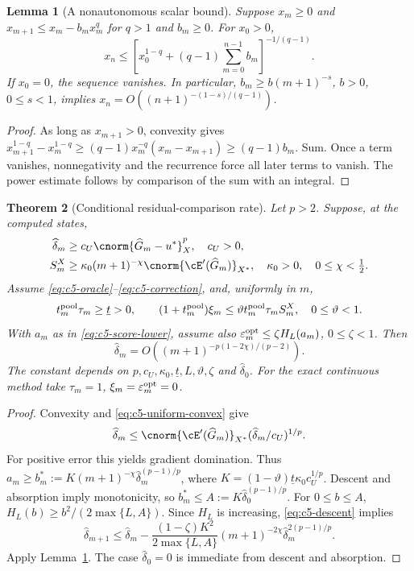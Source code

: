 \documentclass[11pt]{article}
\newtheorem{theorem}{Theorem}[section]
\newtheorem{lemma}[theorem]{Lemma}
\theoremstyle{remark}
\begin{document}
\begin{lemma}[A nonautonomous scalar bound]
\label{lem:c5-recurrence}
Suppose $x_m\geq0$ and
$x_{m+1}\leq x_m-b_mx_m^q$ for $q>1$ and $b_m\geq0$.
For $x_0>0$,
\begin{equation}
 x_n\leq\left[x_0^{1-q}+(q-1)\sum_{m=0}^{n-1}b_m\right]^{-1/(q-1)} .
 \label{eq:c5-recurrence}
\end{equation}
If $x_0=0$, the sequence vanishes. In particular,
$b_m\geq b(m+1)^{-s}$, $b>0$, $0\leq s<1$, implies
$x_n=O((n+1)^{-(1-s)/(q-1)})$.
\end{lemma}
\begin{proof}
As long as $x_{m+1}>0$, convexity gives
$x_{m+1}^{1-q}-x_m^{1-q}\geq
(q-1)x_m^{-q}(x_m-x_{m+1})\geq(q-1)b_m$.
Sum. Once a term vanishes, nonnegativity and the recurrence force all
later terms to vanish. The power estimate follows by comparison of the
sum with an integral.
\end{proof}

\begin{theorem}[Conditional residual-comparison rate]
\label{thm:c5-visible}
Let $p>2$. Suppose, at the computed states,
\begin{align}
 \widehat\delta_m&\geq c_U\cnorm{\widehat G_m-u^*}_X^p,\quad c_U>0,
 \label{eq:c5-uniform-convex}\\
 S_m^X&\geq\kappa_0(m+1)^{-\chi}
                   \cnorm{\cE'(\widehat G_m)}_{X^*},
 \quad\kappa_0>0,\quad0\leq\chi<\tfrac12 .
 \label{eq:c5-visible}
\end{align}
Assume \eqref{eq:c5-oracle}--\eqref{eq:c5-correction}, and, uniformly in $m$,
\[
 t_m^{\rm pool}\tau_m\geq\underline t>0,\qquad
 (1+t_m^{\rm pool})\xi_m
 \leq\vartheta t_m^{\rm pool}\tau_m S_m^X,\quad0\leq\vartheta<1 .
\]
With $a_m$ as in \eqref{eq:c5-score-lower}, assume also
$\varepsilon_m^{\rm opt}\leq\zeta H_L(a_m)$, $0\leq\zeta<1$.
Then
\begin{equation}
 \widehat\delta_m=O((m+1)^{-p(1-2\chi)/(p-2)}) .
 \label{eq:c5-visible-rate}
\end{equation}
The constant depends on $p,c_U,\kappa_0,\underline t,L,\vartheta,\zeta$ and
$\widehat\delta_0$. For the exact continuous method take
$\tau_m=1$, $\xi_m=\varepsilon_m^{\rm opt}=0$.
\end{theorem}
\begin{proof}
Convexity and \eqref{eq:c5-uniform-convex} give
\[
 \widehat\delta_m\leq
 \cnorm{\cE'(\widehat G_m)}_{X^*}
       (\widehat\delta_m/c_U)^{1/p}.
\]
For positive error this yields gradient domination.
Thus $a_m\geq b_m^*:=K(m+1)^{-\chi}
\widehat\delta_m^{(p-1)/p}$, where
$K=(1-\vartheta)\underline t\kappa_0c_U^{1/p}$.
Descent and absorption imply monotonicity, so
$b_m^*\leq A:=K\widehat\delta_0^{(p-1)/p}$.
For $0\leq b\leq A$,
$H_L(b)\geq b^2/(2\max\{L,A\})$.
Since $H_L$ is increasing, \eqref{eq:c5-descent} implies
\[
 \widehat\delta_{m+1}\leq\widehat\delta_m-
 \frac{(1-\zeta)K^2}{2\max\{L,A\}}
 (m+1)^{-2\chi}\widehat\delta_m^{2(p-1)/p}.
\]
Apply Lemma~\ref{lem:c5-recurrence}. The case $\widehat\delta_0=0$
is immediate from descent and absorption.
\end{proof}
\end{document}
